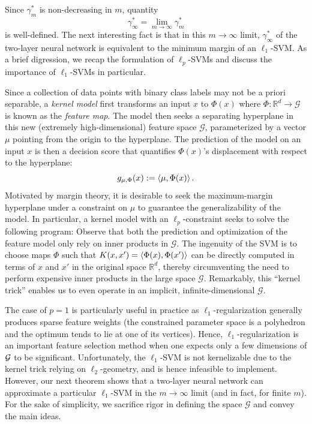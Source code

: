 
Since $\gamma_m^*$ is non-decreasing in $m$, quantity 
\begin{equation}
\gamma_\infty ^* = \lim_{m\to \infty } \gamma_m^*
\end{equation}
is well-defined. The next interesting fact is that in this $m \to \infty$ limit, $\gamma_{\infty}^*$ of the two-layer neural network is equivalent to the minimum margin of an $\ell_1$-SVM. As a brief digression, we recap the formulation of $\ell_p$-SVMs and discuss the importance of $\ell_1$-SVMs in particular.

Since a collection of data points with binary class labels may not be a priori separable, a \textit{kernel model} first transforms an input $x$ to $\Phi(x)$ where $\Phi: \mathbb{R}^d \to \mathcal{G}$ is known as the \textit{feature map}. The model then seeks a separating hyperplane in this new (extremely high-dimensional) feature space $\mathcal{G}$, parameterized by a vector $\mu$ pointing from the origin to the hyperplane. The prediction of the model on an input $x$ is then a decision score that quantifies $\Phi(x)$'s displacement with respect to the hyperplane:
\begin{equation}
g_{\mu, \Phi}(x) := \left\langle \mu, \Phi(x) \right\rangle.
\end{equation}
Motivated by margin theory, it is desirable to seek the maximum-margin hyperplane under a constraint on $\mu$ to guarantee the generalizability of the model. In particular, a kernel model with an $\ell_p$-constraint seeks to solve the following program:
Observe that both the prediction and optimization of the feature model only rely on inner products in $\mathcal{G}$. The ingenuity of the SVM is to choose maps $\Phi$ such that $K(x, x') = \left\langle \Phi(x), \Phi(x') \right\rangle$ can be directly computed in terms of $x$ and $x'$ in the original space $\mathbb{R}^d$, thereby circumventing the need to perform expensive inner products in the large space $\mathcal{G}$. Remarkably, this ``kernel trick'' enables us to even operate in an implicit, infinite-dimensional $\mathcal{G}$. 

The case of $p=1$ is particularly useful in practice as $\ell_1$-regularization generally produces sparse feature weights (the constrained parameter space is a polyhedron and the optimum tends to lie at one of its vertices). Hence, $\ell_1$-regularization is an important feature selection method when one expects only a few dimensions of $\mathcal G$ to be significant. Unfortunately, the $\ell_1$-SVM is not kernelizable due to the kernel trick relying on $\ell_2$-geometry, and is hence infeasible to implement. However, our next theorem shows that a two-layer neural network can approximate a particular $\ell_1$-SVM in the $m \to \infty$ limit (and in fact, for finite $m$). For the sake of simplicity, we sacrifice rigor in defining the space $\mathcal{G}$ and convey the main ideas.

